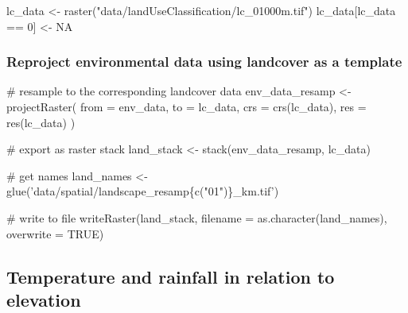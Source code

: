 \documentclass[]{article}
\newenvironment{Shaded}{}{}
\newcommand{\CommentTok}[1]{\textcolor[rgb]{0.00,0.50,0.00}{#1}}
\newcommand{\DataTypeTok}[1]{#1}
\newcommand{\DecValTok}[1]{#1}
\newcommand{\KeywordTok}[1]{\textcolor[rgb]{0.00,0.00,1.00}{#1}}
\newcommand{\NormalTok}[1]{#1}
\newcommand{\OperatorTok}[1]{#1}
\newcommand{\OtherTok}[1]{\textcolor[rgb]{1.00,0.25,0.00}{#1}}
\newcommand{\StringTok}[1]{\textcolor[rgb]{0.00,0.50,0.50}{#1}}
\begin{document}
\begin{Shaded}
\begin{Highlighting}[]
\NormalTok{lc_data <-}\StringTok{ }\KeywordTok{raster}\NormalTok{(}\StringTok{"data/landUseClassification/lc_01000m.tif"}\NormalTok{)}
\NormalTok{lc_data[lc_data }\OperatorTok{==}\StringTok{ }\DecValTok{0}\NormalTok{] <-}\StringTok{ }\OtherTok{NA}
\end{Highlighting}
\end{Shaded}

\hypertarget{reproject-environmental-data-using-landcover-as-a-template}{%
\subsubsection{Reproject environmental data using landcover as a template}\label{reproject-environmental-data-using-landcover-as-a-template}}

\begin{Shaded}
\begin{Highlighting}[]

\CommentTok{# resample to the corresponding landcover data}
\NormalTok{env_data_resamp <-}\StringTok{ }\KeywordTok{projectRaster}\NormalTok{(}
  \DataTypeTok{from =}\NormalTok{ env_data, }\DataTypeTok{to =}\NormalTok{ lc_data,}
  \DataTypeTok{crs =} \KeywordTok{crs}\NormalTok{(lc_data), }\DataTypeTok{res =} \KeywordTok{res}\NormalTok{(lc_data)}
\NormalTok{)}

\CommentTok{# export as raster stack}
\NormalTok{land_stack <-}\StringTok{ }\KeywordTok{stack}\NormalTok{(env_data_resamp, lc_data)}

\CommentTok{# get names}
\NormalTok{land_names <-}\StringTok{ }\KeywordTok{glue}\NormalTok{(}\StringTok{'data/spatial/landscape_resamp\{c("01")\}_km.tif'}\NormalTok{)}

\CommentTok{# write to file}
\KeywordTok{writeRaster}\NormalTok{(land_stack, }\DataTypeTok{filename =} \KeywordTok{as.character}\NormalTok{(land_names), }\DataTypeTok{overwrite =} \OtherTok{TRUE}\NormalTok{)}
\end{Highlighting}
\end{Shaded}

\hypertarget{temperature-and-rainfall-in-relation-to-elevation}{%
\subsection{Temperature and rainfall in relation to elevation}\label{temperature-and-rainfall-in-relation-to-elevation}}
\end{document}
